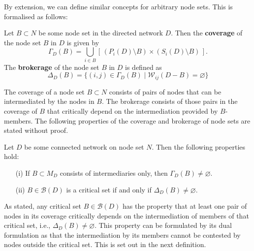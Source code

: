 By extension, we can define similar concepts for arbitrary node sets. This is formalised as follows:
\begin{definition}
Let $B \subset N$ be some node set in the directed network $D$. Then the \textbf{coverage} of the node set $B$ in $D$ is given by
\begin{equation}
\Gamma_D (B) =\bigcup_{i \in B} \left[ \, ( P_{i} \left( D \right) \setminus B ) \times \left( S_{i} \left( D \right) \setminus B \right) \, \right].
\end{equation}
The \textbf{brokerage} of the node set $B$ in $D$ is defined as
\begin{equation}
\Delta_D (B) = \{ (i,j) \in \Gamma_D (B) \mid \mathcal{W}_{ij} (D-B) = \varnothing \}
\end{equation}
\end{definition}
The coverage of a node set $B \subset N$ consists of pairs of nodes that can be intermediated by the nodes in $B$. The brokerage consists of those pairs in the coverage of $B$ that critically depend on the intermediation provided by $B$-members. The following properties of the coverage and brokerage of node sets are stated without proof.
\begin{property}
Let $D$ be some connected network on node set $N$. Then the following properties hold:
\begin{itemize}
\item[(i)] If $B \subset M_D$ consists of intermediaries only, then $\Gamma_D (B) \neq \varnothing$.

\item[(ii)] $B \in \mathcal{B} (D)$ is a critical set if and only if $\Delta_D (B) \neq \varnothing$.
\end{itemize}
\end{property}
As stated, any critical set $B \in \mathcal{B} (D)$ has the property that at least one pair of nodes in its coverage critically depends on the intermediation of members of that critical set, i.e., $\Delta_D (B) \neq \varnothing$. This property can be formulated by its dual formulation as that the intermediation by its members cannot be contested by nodes outside the critical set. This is set out in the next definition.
